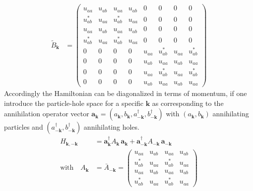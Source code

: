 \begin{align*}
    \tilde{B}_{\mathbf{k}} &=
    \begin{pmatrix}
u_{aa} & u_{ab} & u_{aa} & u_{ab} &0 & 0 & 0 & 0  \\
u_{ab}^{*} & u_{aa}& u_{ab}^{*} & u_{aa} & 0 & 0 & 0 & 0  \\
u_{aa} & u_{ab} & u_{aa} & u_{ab} & 0 & 0 & 0 & 0 \\
u_{ab}^{*} & u_{aa} & u_{ab}^{*} & u_{aa} & 0 & 0 & 0 & 0\\
0 & 0 & 0 & 0 & u_{aa} & u_{ab}^{*} & u_{aa} & u_{ab}^{*} \\
0 & 0 & 0 & 0 & u_{ab} & u_{aa} & u_{ab} & u_{aa} \\
0 & 0 & 0 & 0 & u_{aa} & u_{ab}^{*} & u_{aa} & u_{ab}^{*} \\
0 & 0 & 0 & 0 & u_{ab} & u_{aa} & u_{ab} & u_{aa} 
\end{pmatrix}
\end{align*}
Accordingly the Hamiltonian can be diagonalized in terms of momentum, if one introduce the particle-hole space for a specific $\mathbf{k}$ as corresponding to the annihilation operator vector $\mathbf{a}_\mathbf{k}=(a_\mathbf{k},b_\mathbf{k},a_{-\mathbf{k}}^{\dagger},b_{-\mathbf{k}}^{\dagger})$ with $(a_\mathbf{k},b_\mathbf{k})$ annihilating particles and $(a_{-\mathbf{k}}^{\dagger},b_{-\mathbf{k}}^{\dagger})$ annihilating holes.
\begin{align*}
    H_{\mathbf{k},-\mathbf{k}}&= \mathbf{a}_\mathbf{k}^\dagger A_\mathbf{k}\,\mathbf{a}_\mathbf{k} + \mathbf{a}_{-\mathbf{k}}^\dagger A_{-\mathbf{k}}\,\mathbf{a}_{-\mathbf{k}}\\
    \text{with}\quad A_\mathbf{k}&=\bar{A}_{-\mathbf{k}}=\begin{pmatrix}
u_{aa} & u_{ab} & u_{aa} & u_{ab}  \\
u_{ab}^{*} & u_{aa}& u_{ab}^{*} & u_{aa}  \\
u_{aa} & u_{ab} & u_{aa} & u_{ab}  \\
u_{ab}^{*} & u_{aa} & u_{ab}^{*} & u_{aa} \end{pmatrix}
\end{align*}

